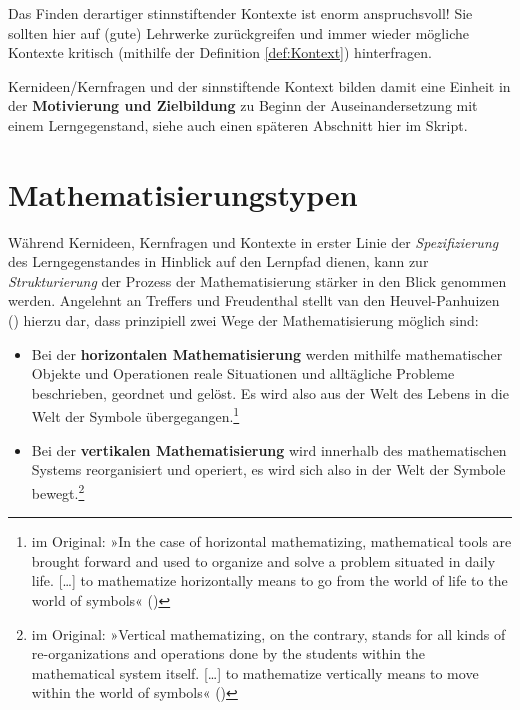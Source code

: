 \documentclass[
]{scrbook}
\theoremstyle{definition}
\theoremstyle{definition}
\theoremstyle{definition}
\theoremstyle{definition}
\theoremstyle{remark}
\begin{document}
Das Finden derartiger stinnstiftender Kontexte ist enorm anspruchsvoll! Sie sollten hier auf (gute) Lehrwerke zurückgreifen und immer wieder mögliche Kontexte kritisch (mithilfe der Definition \ref{def:Kontext}) hinterfragen.

Kernideen/Kernfragen und der sinnstiftende Kontext bilden damit eine Einheit in der \textbf{Motivierung und Zielbildung} zu Beginn der Auseinandersetzung mit einem Lerngegenstand, siehe auch einen späteren Abschnitt hier im Skript.

\section{Mathematisierungstypen}\label{mathematisierungstypen}

Während Kernideen, Kernfragen und Kontexte in erster Linie der \emph{Spezifizierung} des Lerngegenstandes in Hinblick auf den Lernpfad dienen, kann zur \emph{Strukturierung} der Prozess der Mathematisierung stärker in den Blick genommen werden. Angelehnt an Treffers und Freudenthal stellt van den Heuvel-Panhuizen () hierzu dar, dass prinzipiell zwei Wege der Mathematisierung möglich sind:

\begin{itemize}
\item
  Bei der \textbf{horizontalen Mathematisierung} werden mithilfe mathematischer Objekte und Operationen reale Situationen und alltägliche Probleme beschrieben, geordnet und gelöst. Es wird also aus der Welt des Lebens in die Welt der Symbole übergegangen.\footnote{im Original: »In the case of horizontal mathematizing, mathematical tools are brought forward and used to organize and solve a problem situated in daily life. {[}\ldots{]} to mathematize horizontally means to go from the world of life to the world of symbols« ()}
\item
  Bei der \textbf{vertikalen Mathematisierung} wird innerhalb des mathematischen Systems reorganisiert und operiert, es wird sich also in der Welt der Symbole bewegt.\footnote{im Original: »Vertical mathematizing, on the contrary, stands for all kinds of re-organizations and operations done by the students within the mathematical system itself. {[}\ldots{]} to mathematize vertically means to move within the world of symbols« ()}
\end{itemize}
\end{document}
